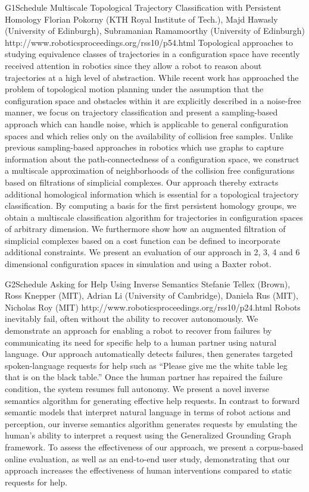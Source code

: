 \begin{spacing}{1.0}
\descriptionPaper
{G1}{Schedule}
{	
Multiscale Topological Trajectory Classification with Persistent Homology
}
{
Florian Pokorny (KTH Royal Institute of Tech.), Majd Hawasly (University of Edinburgh), Subramanian Ramamoorthy (University of Edinburgh)
}
{
http://www.roboticsproceedings.org/rss10/p54.html
}
{
Topological approaches to studying equivalence classes of trajectories in a configuration space have recently received attention in robotics since they allow a robot to reason about trajectories at a high level of abstraction. While recent work has approached the problem of topological motion planning under the assumption that the configuration space and obstacles within it are explicitly described in a noise-free manner, we focus on trajectory classification and present a sampling-based approach which can handle noise, which is applicable to general configuration spaces and which relies only on the availability of collision free samples. Unlike previous sampling-based approaches in robotics which use graphs to capture information about the path-connectedness of a configuration space, we construct a multiscale approximation of neighborhoods of the collision free configurations based on filtrations of simplicial complexes. Our approach thereby extracts additional homological information which is essential for a topological trajectory classification. By computing a basis for the first persistent homology groups, we obtain a multiscale classification algorithm for trajectories in configuration spaces of arbitrary dimension. We furthermore show how an augmented filtration of simplicial complexes based on a cost function can be defined to incorporate additional constraints. We present an evaluation of our approach in 2, 3, 4 and 6 dimensional configuration spaces in simulation and using a Baxter robot.
}


\descriptionPaper
{G2}{Schedule}
{	
Asking for Help Using Inverse Semantics 
}
{
Stefanie Tellex (Brown), Ross Knepper (MIT), Adrian Li (University of Cambridge), Daniela Rus (MIT), Nicholas Roy (MIT)
}
{
http://www.roboticsproceedings.org/rss10/p24.html
}
{
Robots inevitably fail, often without the ability to recover autonomously. We demonstrate an approach for enabling a robot to recover from failures by communicating its need for specific help to a human partner using natural language. Our approach automatically detects failures, then generates targeted spoken-language requests for help such as ``Please give me the white table leg that is on the black table.'' Once the human partner has repaired the failure condition, the system resumes full autonomy. We present a novel inverse semantics algorithm for generating effective help requests. In contrast to forward semantic models that interpret natural language in terms of robot actions and perception, our inverse semantics algorithm generates requests by emulating the human's ability to interpret a request using the Generalized Grounding Graph framework. To assess the effectiveness of our approach, we present a corpus-based online evaluation, as well as an end-to-end user study, demonstrating that our approach increases the effectiveness of human interventions compared to static requests for help.
}



\end{spacing}
